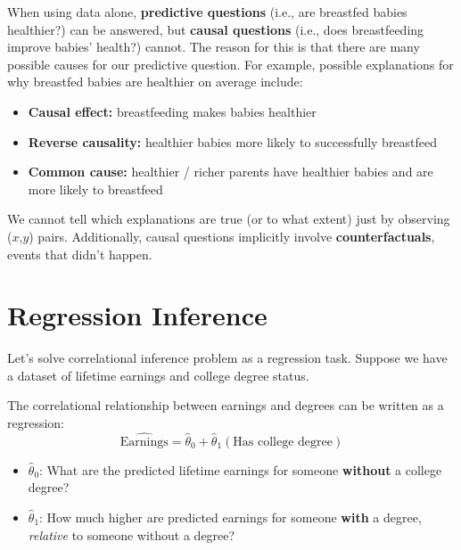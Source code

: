 \documentclass[
  letterpaper,
  DIV=11,
  numbers=noendperiod]{scrreprt}
\providecommand{\tightlist}{%
  \setlength{\itemsep}{0pt}\setlength{\parskip}{0pt}}\usepackage{longtable,booktabs,array}
\begin{document}
\begin{tcolorbox}[enhanced jigsaw, arc=.35mm, left=2mm, toprule=.15mm, leftrule=.75mm, bottomrule=.15mm, colframe=quarto-callout-tip-color-frame, rightrule=.15mm, colbacktitle=quarto-callout-tip-color!10!white, opacitybacktitle=0.6, coltitle=black, bottomtitle=1mm, colback=white, toptitle=1mm, title=\textcolor{quarto-callout-tip-color}{\faLightbulb}\hspace{0.5em}{Tip}, breakable, opacityback=0, titlerule=0mm]

When using data alone, \textbf{predictive questions} (i.e., are
breastfed babies healthier?) can be answered, but \textbf{causal
questions} (i.e., does breastfeeding improve babies' health?) cannot.
The reason for this is that there are many possible causes for our
predictive question. For example, possible explanations for why
breastfed babies are healthier on average include:

\begin{itemize}
\tightlist
\item
  \textbf{Causal effect:} breastfeeding makes babies healthier
\item
  \textbf{Reverse causality:} healthier babies more likely to
  successfully breastfeed
\item
  \textbf{Common cause:} healthier / richer parents have healthier
  babies and are more likely to breastfeed
\end{itemize}

We cannot tell which explanations are true (or to what extent) just by
observing (\(x\),\(y\)) pairs. Additionally, causal questions implicitly
involve \textbf{counterfactuals}, events that didn't happen.

\end{tcolorbox}

\section{Regression Inference}\label{regression-inference}

Let's solve correlational inference problem as a regression task.
Suppose we have a dataset of lifetime earnings and college degree
status.

The correlational relationship between earnings and degrees can be
written as a regression: \[
\widehat{\text{Earnings}} = \hat{\theta}_0 + \hat{\theta}_1 (\text{Has college degree})
\]

\begin{itemize}
\tightlist
\item
  \(\hat{\theta}_0\): What are the predicted lifetime earnings for
  someone \textbf{without} a college degree?
\item
  \(\hat{\theta}_1\): How much higher are predicted earnings for someone
  \textbf{with} a degree, \emph{relative} to someone without a degree?
\end{itemize}
\end{document}
